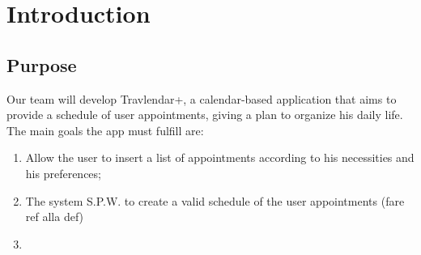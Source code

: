 \chapter{Introduction}

\section{Purpose}

Our team will develop Travlendar+, a calendar-based application that aims to provide a schedule of user appointments, giving a plan to organize his daily life.
The main goals the app must fulfill are:

\begin{enumerate}
\renewcommand\labelenumi{\textbf{G\theenumi}}

\item Allow the user to insert a list of appointments according to his necessities and his preferences;  \label{goal:G1}

\item The system S.P.W. to create a valid schedule of the user appointments (fare ref alla def) \label{goal:G2}


\item 

\end{enumerate}


